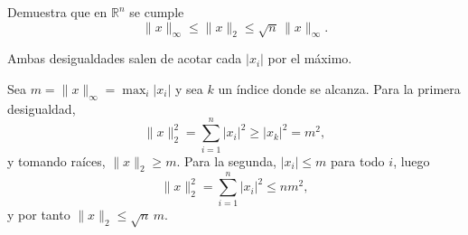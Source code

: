 \begin{exercise}
Demuestra que en $\mathbb{R}^n$ se cumple
\[
  \|x\|_\infty \leq \|x\|_2 \leq \sqrt{n}\,\|x\|_\infty .
\]

\begin{answer}
Ambas desigualdades salen de acotar cada $|x_i|$ por el máximo.
\end{answer}

\begin{solution}
Sea $m = \|x\|_\infty = \max_i |x_i|$ y sea $k$ un índice donde se alcanza.
Para la primera desigualdad,
\[
  \|x\|_2^2 = \sum_{i=1}^n |x_i|^2 \geq |x_k|^2 = m^2 ,
\]
y tomando raíces, $\|x\|_2 \geq m$. Para la segunda, $|x_i| \leq m$ para todo
$i$, luego
\[
  \|x\|_2^2 = \sum_{i=1}^n |x_i|^2 \leq n m^2 ,
\]
y por tanto $\|x\|_2 \leq \sqrt{n}\, m$.
\end{solution}
\end{exercise}
